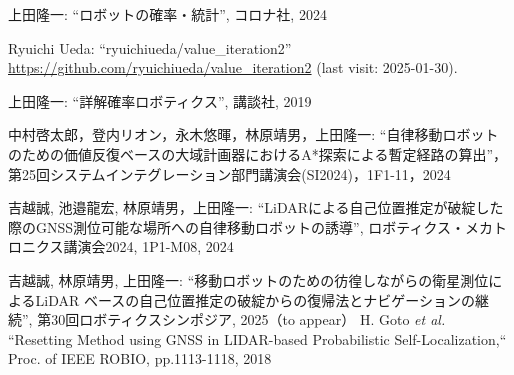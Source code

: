 \documentclass[twocolumn,9pt]{jsproceedings}
\begin{document}
\begin{thebibliography}{99}
    上田隆一: ``ロボットの確率・統計'', コロナ社, 2024

    Ryuichi Ueda: ``ryuichiueda/value\_iteration2'' \url{https://github.com/ryuichiueda/value_iteration2} (last visit: 2025-01-30).

    上田隆一: ``詳解確率ロボティクス'', 講談社, 2019

    中村啓太郎，登内リオン，永木悠暉，林原靖男，上田隆一: ``自律移動ロボットのための価値反復ベースの大域計画器におけるA*探索による暫定経路の算出''，第25回システムインテグレーション部門講演会(SI2024)，1F1-11，2024

	  吉越誠, 池邉龍宏, 林原靖男，上田隆一: ``LiDARによる自己位置推定が破綻した際のGNSS測位可能な場所への自律移動ロボットの誘導'', ロボティクス・メカトロニクス講演会2024, 1P1-M08, 2024

	  吉越誠, 林原靖男, 上田隆一: ``移動ロボットのための彷徨しながらの衛星測位によるLiDAR ベースの自己位置推定の破綻からの復帰法とナビゲーションの継続'', 第30回ロボティクスシンポジア, 2025（to appear）
	  H. Goto {\it et al.} ``Resetting Method using GNSS in LIDAR-based Probabilistic Self-Localization,`` Proc. of IEEE ROBIO, pp.1113-1118, 2018







\end{thebibliography}
\end{document}
